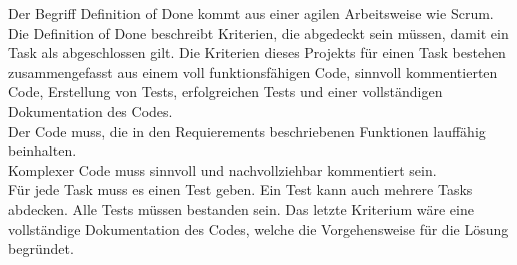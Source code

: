 Der Begriff Definition of Done kommt aus einer agilen Arbeitsweise wie Scrum.\\
Die Definition of Done beschreibt Kriterien, die abgedeckt sein müssen, damit ein Task als abgeschlossen gilt.
Die Kriterien dieses Projekts für einen Task bestehen zusammengefasst aus einem voll funktionsfähigen Code, sinnvoll kommentierten Code, Erstellung von Tests, erfolgreichen Tests und einer vollständigen Dokumentation des Codes.\\
Der Code muss, die in den Requierements beschriebenen Funktionen lauffähig beinhalten.\\
Komplexer Code muss sinnvoll und nachvollziehbar kommentiert sein.\\
Für jede Task muss es einen Test geben. Ein Test kann auch mehrere Tasks abdecken. Alle Tests müssen bestanden sein.
Das letzte Kriterium wäre eine vollständige Dokumentation des Codes, welche die Vorgehensweise für die Lösung begründet.